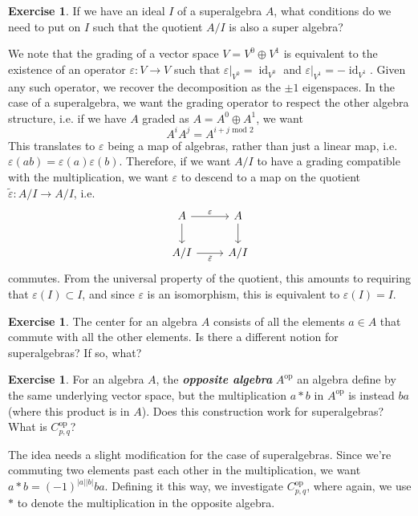 \documentclass[psamsfonts]{amsart}
\theoremstyle{definition}
\newtheorem{exer}[thm]{Exercise}
\theoremstyle{remark}
\newcommand{\ib}[1]{\textbf{\textit{#1}}}
\DeclareMathOperator{\id}{id}
\begin{document}
%
\begin{exer}
If we have an ideal $I$ of a superalgebra $A$, what conditions do we need to put on $I$ such that the quotient $A/I$ is also a super algebra?
\end{exer}
We note that the grading of a vector space $V = V^0 \oplus V^1$ is equivalent to the existence of an operator $\varepsilon : V \to V$ such that $\varepsilon\vert_{V^0} = \id_{V^0}$ and $\varepsilon\vert_{V^1} = -\id_{V^1}$. Given any such operator, we recover the decomposition as the $\pm 1$ eigenspaces. In the case of a superalgebra, we want the grading operator to respect the other algebra structure, i.e. if we have $A$ graded as $A = A^0 \oplus A^1$, we want
$$A^iA^j = A^{i + j \text{ mod } 2} $$
This translates to $\varepsilon$ being a map of algebras, rather than just a linear map, i.e. $\varepsilon(ab) = \varepsilon(a)\varepsilon(b)$. Therefore, if we want $A/I$ to have a grading compatible with the multiplication, we want $\varepsilon$ to descend to a map on the quotient $\tilde{\varepsilon} : A/I \to A/I$, i.e.
$$\begin{tikzcd} 
A \ar[d] \ar[r, "\varepsilon"] & A \ar[d] \\
A /I \ar[r, "\tilde{\varepsilon}"'] & A/I
\end{tikzcd}$$
commutes. From the universal property of the quotient, this amounts to requiring that $\varepsilon(I) \subset I$, and since $\varepsilon$ is an isomorphism, this is equivalent to $\varepsilon(I) = I$.
%
\begin{exer}
The center for an algebra $A$ consists of all the elements $a \in A$ that commute with all the other elements. Is there a different notion for superalgebras? If so, what?
\end{exer}
%
\begin{exer}
For an algebra $A$, the \ib{opposite algebra} $A^\text{op}$ an algebra define by the same underlying vector space, but the multiplication $a*b$ in $A^\text{op}$ is instead $ba$ (where this product is in $A$). Does this construction work for superalgebras? What is $C_{p,q}^\text{op}$?
\end{exer}
The idea needs a slight modification for the case of superalgebras. Since we're commuting two elements past each other in the multiplication, we want $a*b = (-1)^{|a||b|}ba$. Defining it this way, we investigate $C_{p,q}^\text{op}$, where again, we use $*$ to denote the multiplication in the opposite algebra.
\end{document}
